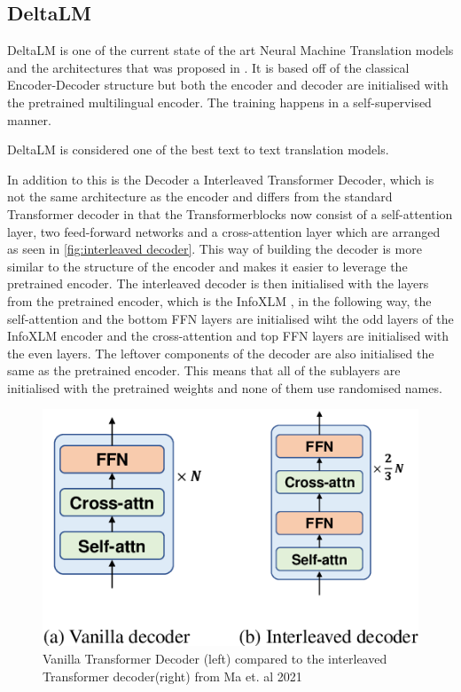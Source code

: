 \subsection{DeltaLM}
DeltaLM is one of the current state of the art Neural Machine Translation models and the architectures that was proposed in \cite{ma2021deltalm}. 
It is based off of the classical Encoder-Decoder structure but both the encoder and decoder are initialised with the pretrained multilingual encoder. 
The training happens in a self-supervised manner. 

DeltaLM is considered one of the best text to text translation models. 

In addition to this is the Decoder a Interleaved Transformer Decoder, which is not the same architecture as the encoder and differs from the standard Transformer decoder in that the Transformerblocks now consist of a self-attention layer, two feed-forward networks and a cross-attention layer which are arranged as seen in \autoref{fig:interleaved decoder}. 
This way of building the decoder is more similar to the structure of the encoder and makes it easier to leverage the pretrained encoder. 
The interleaved decoder is then initialised with the layers from the pretrained encoder, which is the InfoXLM \cite{chi2021infoxlminformationtheoreticframeworkcrosslingual}, in the following way, the self-attention and the bottom FFN layers are initialised wiht the odd layers of the InfoXLM encoder and the cross-attention and top FFN layers are initialised with the even layers. 
The leftover components of the decoder are also initialised the same as the pretrained encoder. 
This means that all of the sublayers are initialised with the pretrained weights and none of them use randomised names. 

\begin{figure}
    \centering%
    \includegraphics[width=0.5\linewidth]{Latex/sections/images/interleaveddecoder.png}
    \caption{Vanilla Transformer Decoder (left) compared to the interleaved Transformer decoder(right) from Ma et. al 2021}
    \label{fig:interleaved decoder}
\end{figure}



